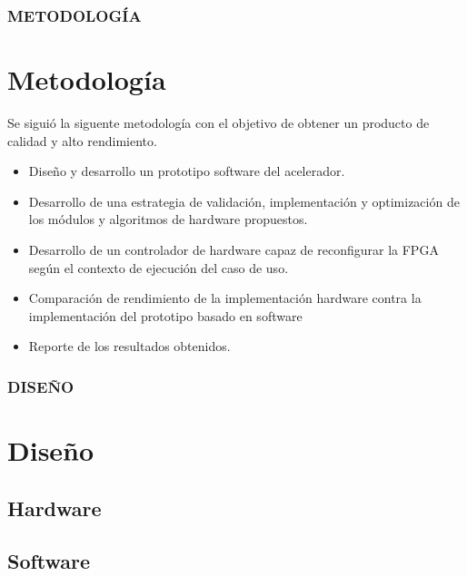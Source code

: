 \documentclass{beamer}
\begin{document}
\begin{frame}
\frametitle{METODOLOGÍA}
\section{Metodología}
Se siguió la siguente metodología con el objetivo de obtener un producto de calidad y alto rendimiento.
\begin{itemize}
    \item Diseño y desarrollo un prototipo software del acelerador.
    \item Desarrollo de una estrategia de validación, implementación y optimización de los módulos y algoritmos de hardware propuestos.
    \item Desarrollo de un controlador de hardware capaz de reconfigurar la FPGA según el contexto de ejecución del caso de uso.
    \item Comparación de rendimiento de la implementación hardware contra la implementación del prototipo basado en software
    \item Reporte de los resultados obtenidos.
\end{itemize}
\end{frame}



\begin{frame}
\frametitle{DISEÑO}
\section{Diseño}

\subsection{Hardware}

\subsection{Software}

\end{frame}
\end{document}
